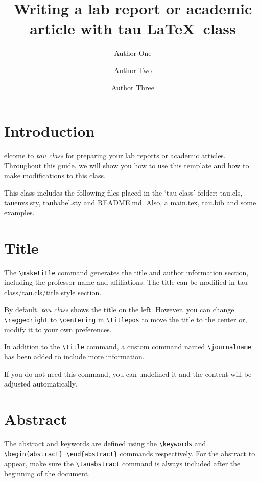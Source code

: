 \documentclass[9pt,a4paper,twocolumn,twoside]{tau-class/tau}
\title{Writing a lab report or academic article with tau \LaTeX\ class}
\author[a,1]{Author One}
\author[b,2]{Author Two}
\author[b,c,3]{Author Three}
\affil[a]{Affiliation of author one}
\affil[b]{Affiliation of author two}
\affil[c]{Affiliation of author three}
\begin{document}
		
    \maketitle 
    \thispagestyle{firststyle} 
    \tauabstract 
    

\section{Introduction}

    elcome to \textit{tau class} for preparing your lab reports or academic articles. Throughout this guide, we will show you how to use this template and how to make modifications to this class. 
	
    This class includes the following files placed in the ‘tau-class’ folder: tau.cls, tauenvs.sty, taubabel.sty and README.md. Also, a main.tex, tau.bib and some examples. 

\section{Title}

    The \verb*|\maketitle| command generates the title and author information section, including the professor name and affiliations. The title can be modified in tau-class/tau.cls/title style section. 
	
    By default, \textit{tau class} shows the title on the left. However, you can change \verb*|\raggedright| to \verb*|\centering| in \verb*|\titlepos| to move the title to the center or, modify it to your own preferences.
	
    In addition to the \verb|\title| command, a custom command named \verb|\journalname| has been added to include more information. 
	
    If you do not need this command, you can undefined it and the content will be adjusted automatically.
	
\section{Abstract}

    The abstract and keywords are defined using the \verb*|\keywords| and \verb*|\begin{abstract} \end{abstract}| commands respectively. For the abstract to appear, make sure the \verb|\tauabstract| command is always included after the beginning of the document.
    
\end{document}
